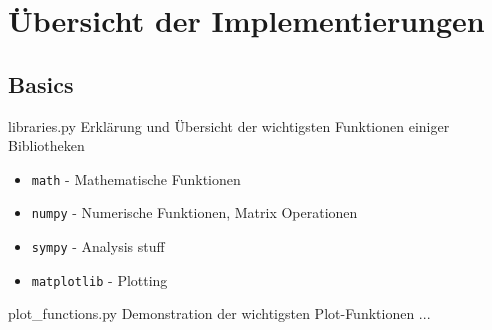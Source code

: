 \section{Übersicht der Implementierungen}

\subsection{Basics}

\begin{KR}{libraries.py}
    Erklärung und Übersicht der wichtigsten Funktionen einiger Bibliotheken
    \begin{itemize}
        \item \texttt{math} - Mathematische Funktionen
        \item \texttt{numpy} - Numerische Funktionen, Matrix Operationen
        \item \texttt{sympy} - Analysis stuff
        \item \texttt{matplotlib} - Plotting
    \end{itemize}
\end{KR}

\begin{KR}{plot_functions.py}
    Demonstration der wichtigsten Plot-Funktionen
 ...
\end{KR}